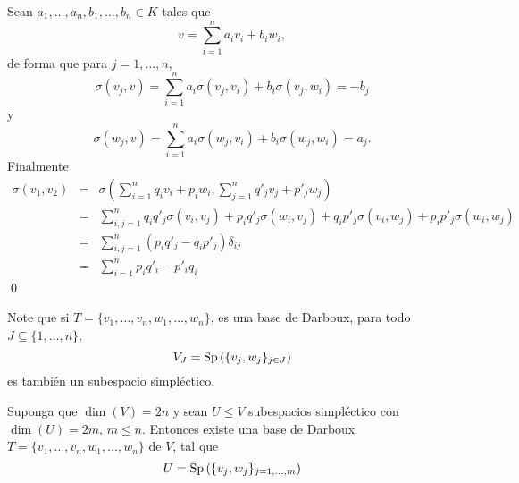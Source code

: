 \dem Sean $a_1,\ldots,a_n,b_1,\ldots,b_n\in K$ tales que
\[
v=\sum_{i=1}^na_iv_i+b_iw_i,
\]
de forma que para $j=1,\ldots,n$,
\[
\sigma(v_j,v)=\sum_{i=1}^na_i\sigma(v_j,v_i)+b_i\sigma(v_j,w_i)=-b_j
\]
y
\[
\sigma(w_j,v)=\sum_{i=1}^na_i\sigma(w_j,v_i)+b_i\sigma(w_j,w_i)=a_j.
\]
Finalmente
\begin{eqnarray*}
\sigma(v_1,v_2) & = & \sigma(\sum_{i=1}^nq_iv_i+p_iw_i,\sum_{j=1}^nq'_jv_j+p'_jw_j)\\
 & = & \sum_{i,j=1}^nq_iq'_j\sigma(v_i,v_j)+p_iq'_j\sigma(w_i,v_j)+q_ip'_j\sigma(v_i,w_j)+p_ip'_j\sigma(w_i,w_j)\\
 & = & \sum_{i,j=1}^n(p_iq'_j-q_ip'_j)\delta_{ij}\\
 & = & \sum_{i=1}^np_iq'_i-p'_iq_i
\end{eqnarray*}
\qed

\begin{obs}
Note que si $T=\{v_1,\ldots,v_n,w_1,\ldots,w_n\}$, es una base de Darboux, para todo $J\subseteq\{1,\ldots,n\}$,
\[
V_J=\operatorname{Sp}\left(\{v_j,w_j\}_{j\in J}\right)
\]
es tambi\'en un subespacio simpl\'ectico.
\end{obs}

\begin{teo}
Suponga que $\dim(V)=2n$ y sean $U\le V$ subespacios simpl\'ectico con $\dim(U)=2m$, $m\le n$. Entonces existe una base de Darboux $T=\{v_1,\ldots,v_n,w_1,\ldots,w_n\}$ de $V$, tal que
\[
U=\operatorname{Sp}\left(\{v_j,w_j\}_{j=1,\ldots,m}\right)
\]
\end{teo}

